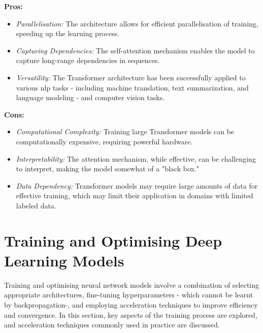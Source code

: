 \textbf{Pros:}
\begin{itemize}
    \item \textit{Parallelisation:} The architecture allows for efficient parallelisation of training, speeding up the learning process.
    \item \textit{Capturing Dependencies:} The self-attention mechanism enables the model to capture long-range dependencies in sequences.
    \item \textit{Versatility:} The Transformer architecture has been successfully applied to various \gls{nlp} tasks - including machine translation, text summarization, and language modeling - and computer vision tasks.
\end{itemize}

\textbf{Cons:}
\begin{itemize}
    \item \textit{Computational Complexity:} Training large Transformer models can be computationally expensive, requiring powerful hardware.
    \item \textit{Interpretability:} The attention mechanism, while effective, can be challenging to interpret, making the model somewhat of a "black box."
    \item \textit{Data Dependency:} Transformer models may require large amounts of data for effective training, which may limit their application in domains with limited labeled data.
\end{itemize}

\section{Training and Optimising Deep Learning Models}
Training and optimising neural network models involve a combination of selecting appropriate architectures, fine-tuning hyperparameters - which cannot be learnt by backpropagation-, and employing acceleration techniques to improve efficiency and convergence. In this section, key aspects of the training process are explored, and acceleration techniques commonly used in practice are discussed. \\

